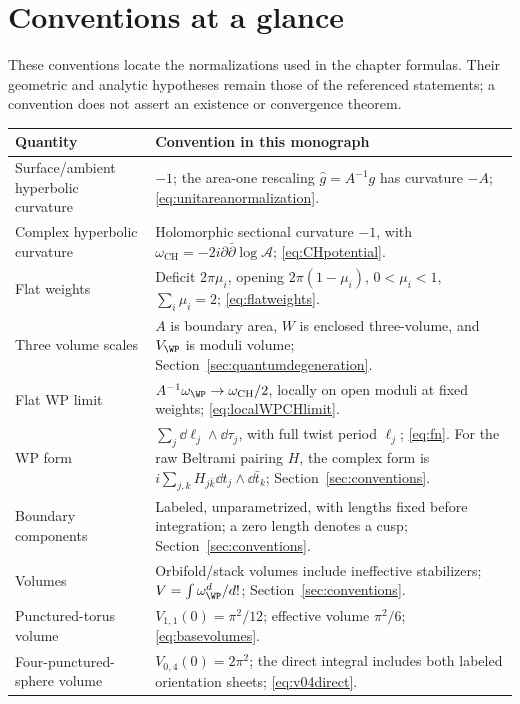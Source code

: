 \section{Conventions at a glance}
\label{app:conventions}

These conventions locate the normalizations used in the chapter formulas.
Their geometric and analytic hypotheses remain those of the referenced
statements; a convention does not assert an existence or convergence theorem.

\begingroup\small
\begin{longtable}{@{}>{\raggedright\arraybackslash}p{}
 >{\raggedright\arraybackslash}p{}@{}}
\toprule
Quantity & Convention in this monograph\\
\midrule
\endhead
Surface/ambient hyperbolic curvature & $-1$; the area-one rescaling $\widehat g=A^{-1}g$ has curvature $-A$; \eqref{eq:unitareanormalization}.\\
Complex hyperbolic curvature & Holomorphic sectional curvature $-1$, with $\omega_{\mathrm{CH}}=-2i\partial\bar\partial\log\mathcal A$; \eqref{eq:CHpotential}.\\
Flat weights & Deficit $2\pi\mu_i$, opening $2\pi(1-\mu_i)$, $0<\mu_i<1$, $\sum_i\mu_i=2$; \eqref{eq:flatweights}.\\
Three volume scales & $A$ is boundary area, $W$ is enclosed three-volume, and $V_{\WP}$ is moduli volume; Section~\ref{sec:quantumdegeneration}.\\
Flat WP limit & $A^{-1}\omega_{\WP}\to\omega_{\mathrm{CH}}/2$, locally on open moduli at fixed weights; \eqref{eq:localWPCHlimit}.\\
WP form & $\sum_j\dd\ell_j\wedge\dd\tau_j$, with full twist period $\ell_j$; \eqref{eq:fn}. For the raw Beltrami pairing $H$, the complex form is $i\sum_{j,k}H_{j\bar k}\dd t_j\wedge\dd\bar t_k$; Section~\ref{sec:conventions}.\\
Boundary components & Labeled, unparametrized, with lengths fixed before integration; a zero length denotes a cusp; Section~\ref{sec:conventions}.\\
Volumes & Orbifold/stack volumes include ineffective stabilizers; $V=\int\omega_{\WP}^{d}/d!$; Section~\ref{sec:conventions}.\\
Punctured-torus volume & $V_{1,1}(0)=\pi^2/12$; effective volume $\pi^2/6$; \eqref{eq:basevolumes}.\\
Four-punctured-sphere volume & $V_{0,4}(0)=2\pi^2$; the direct integral includes both labeled orientation sheets; \eqref{eq:v04direct}.\\

\end{longtable}
